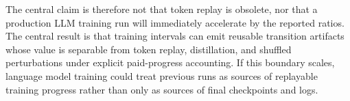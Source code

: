 \documentclass{article}
\begin{document}
The central claim is therefore not that token replay is obsolete, nor that a
production LLM training run will immediately accelerate by the reported
ratios. The central result is that training intervals can emit reusable
transition artifacts whose value is separable from token replay, distillation,
and shuffled perturbations under explicit paid-progress accounting. If this
boundary scales, language model training could treat previous runs as sources
of replayable training progress rather than only as sources of final
checkpoints and logs.



\end{document}
